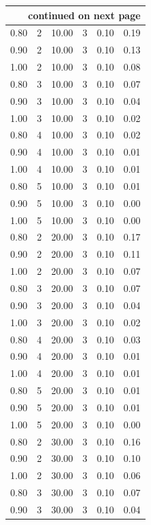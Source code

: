 \documentclass[12pt]{article}
\begin{document}
{\begin{longtable}{cccccc}
\hline \multicolumn{6}{r}{{continued on next page}} \\ \hline
\endfoot

\hline \hline
\endlastfoot


0.80 &   2 & 10.00 &   3 & 0.10 & 0.19 \\ 
  0.90 &   2 & 10.00 &   3 & 0.10 & 0.13 \\ 
  1.00 &   2 & 10.00 &   3 & 0.10 & 0.08 \\ 
  0.80 &   3 & 10.00 &   3 & 0.10 & 0.07 \\ 
  0.90 &   3 & 10.00 &   3 & 0.10 & 0.04 \\ 
  1.00 &   3 & 10.00 &   3 & 0.10 & 0.02 \\ 
  0.80 &   4 & 10.00 &   3 & 0.10 & 0.02 \\ 
  0.90 &   4 & 10.00 &   3 & 0.10 & 0.01 \\ 
  1.00 &   4 & 10.00 &   3 & 0.10 & 0.01 \\ 
  0.80 &   5 & 10.00 &   3 & 0.10 & 0.01 \\ 
  0.90 &   5 & 10.00 &   3 & 0.10 & 0.00 \\ 
  1.00 &   5 & 10.00 &   3 & 0.10 & 0.00 \\ 
  0.80 &   2 & 20.00 &   3 & 0.10 & 0.17 \\ 
  0.90 &   2 & 20.00 &   3 & 0.10 & 0.11 \\ 
  1.00 &   2 & 20.00 &   3 & 0.10 & 0.07 \\ 
  0.80 &   3 & 20.00 &   3 & 0.10 & 0.07 \\ 
  0.90 &   3 & 20.00 &   3 & 0.10 & 0.04 \\ 
  1.00 &   3 & 20.00 &   3 & 0.10 & 0.02 \\ 
  0.80 &   4 & 20.00 &   3 & 0.10 & 0.03 \\ 
  0.90 &   4 & 20.00 &   3 & 0.10 & 0.01 \\ 
  1.00 &   4 & 20.00 &   3 & 0.10 & 0.01 \\ 
  0.80 &   5 & 20.00 &   3 & 0.10 & 0.01 \\ 
  0.90 &   5 & 20.00 &   3 & 0.10 & 0.01 \\ 
  1.00 &   5 & 20.00 &   3 & 0.10 & 0.00 \\ 
  0.80 &   2 & 30.00 &   3 & 0.10 & 0.16 \\ 
  0.90 &   2 & 30.00 &   3 & 0.10 & 0.10 \\ 
  1.00 &   2 & 30.00 &   3 & 0.10 & 0.06 \\ 
  0.80 &   3 & 30.00 &   3 & 0.10 & 0.07 \\ 
  0.90 &   3 & 30.00 &   3 & 0.10 & 0.04 \\ 

\end{longtable}}
\end{document}
